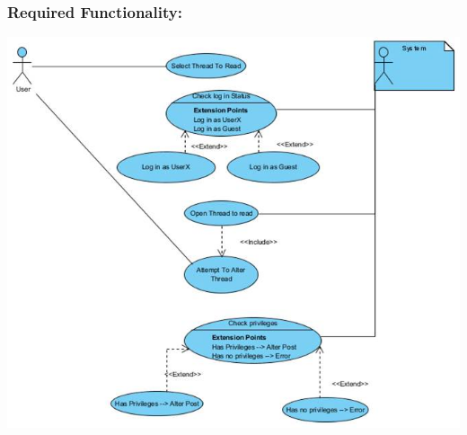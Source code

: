 \documentclass[a4paper,11pt]{article}
\begin{document}
\subsubsection{Required Functionality:} 
\includegraphics[width=1\linewidth]{./Images/CRUDThread/Diagrams/6.jpg}\\
\end{document}
